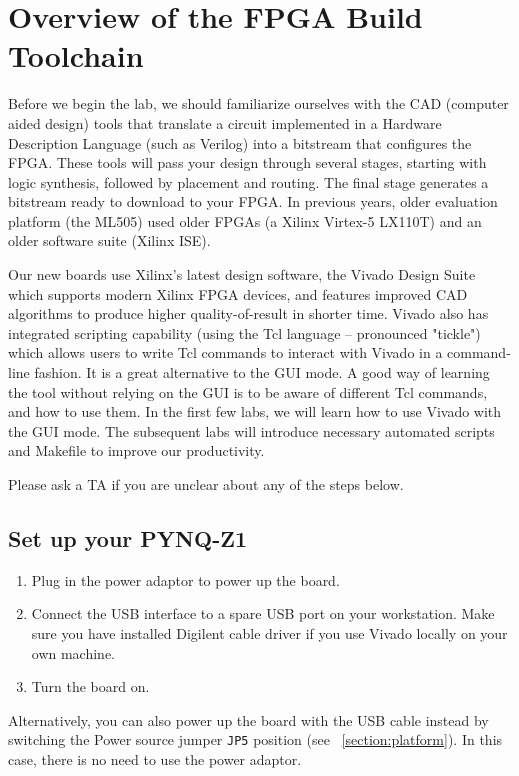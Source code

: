 \documentclass[11pt]{article}
\begin{document}
\section{Overview of the FPGA Build Toolchain}

Before we begin the lab, we should familiarize ourselves with the CAD (computer aided design) tools that translate a circuit implemented in a Hardware Description Language (such as Verilog) into a bitstream that configures the FPGA.
These tools will pass your design through several stages, starting with logic synthesis, followed by placement and routing. The final stage generates a bitstream ready to download to your FPGA.
In previous years, older evaluation platform (the ML505) used older FPGAs (a Xilinx Virtex-5 LX110T) and an older software suite (Xilinx ISE).

Our new boards use Xilinx's latest design software, the Vivado Design Suite which supports modern Xilinx FPGA devices, and features improved CAD algorithms to produce higher quality-of-result in shorter time.
Vivado also has integrated scripting capability (using the Tcl language -- pronounced "tickle") which allows users to write Tcl commands to interact with Vivado in a command-line fashion.
It is a great alternative to the GUI mode. A good way of learning the tool without relying on the GUI is to be aware of different Tcl commands, and how to use them. In the first few labs, we will learn how to use Vivado with the GUI mode. The subsequent labs will introduce necessary automated scripts and Makefile to improve our productivity.

Please ask a TA if you are unclear about any of the steps below.

\subsection{Set up your PYNQ-Z1}
\begin{enumerate}
  \item Plug in the power adaptor to power up the board.
  \item Connect the USB interface to a spare USB port on your workstation. Make sure you have installed Digilent cable driver if you use Vivado locally on your own machine.
  \item Turn the board on.
\end{enumerate}

Alternatively, you can also power up the board with the USB cable instead by switching the Power source jumper \texttt{JP5} position (see ~\ref{section:platform}). In this case, there is no need to use the power adaptor.
\end{document}
